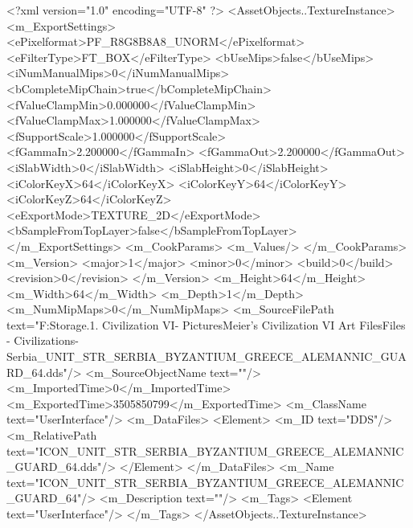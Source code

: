 <?xml version="1.0" encoding="UTF-8" ?>
<AssetObjects..TextureInstance>
	<m_ExportSettings>
		<ePixelformat>PF_R8G8B8A8_UNORM</ePixelformat>
		<eFilterType>FT_BOX</eFilterType>
		<bUseMips>false</bUseMips>
		<iNumManualMips>0</iNumManualMips>
		<bCompleteMipChain>true</bCompleteMipChain>
		<fValueClampMin>0.000000</fValueClampMin>
		<fValueClampMax>1.000000</fValueClampMax>
		<fSupportScale>1.000000</fSupportScale>
		<fGammaIn>2.200000</fGammaIn>
		<fGammaOut>2.200000</fGammaOut>
		<iSlabWidth>0</iSlabWidth>
		<iSlabHeight>0</iSlabHeight>
		<iColorKeyX>64</iColorKeyX>
		<iColorKeyY>64</iColorKeyY>
		<iColorKeyZ>64</iColorKeyZ>
		<eExportMode>TEXTURE_2D</eExportMode>
		<bSampleFromTopLayer>false</bSampleFromTopLayer>
	</m_ExportSettings>
	<m_CookParams>
		<m_Values/>
	</m_CookParams>
	<m_Version>
		<major>1</major>
		<minor>0</minor>
		<build>0</build>
		<revision>0</revision>
	</m_Version>
	<m_Height>64</m_Height>
	<m_Width>64</m_Width>
	<m_Depth>1</m_Depth>
	<m_NumMipMaps>0</m_NumMipMaps>
	<m_SourceFilePath text="F:\Mod Storage\2.1. Civilization VI\Mods\Archive - Pictures\Sid Meier's Civilization VI Art Files\Art Files - Civilizations\Civilization - Serbia\ICON_UNIT_STR_SERBIA_BYZANTIUM_GREECE_ALEMANNIC_GUARD_64.dds"/>
	<m_SourceObjectName text=""/>
	<m_ImportedTime>0</m_ImportedTime>
	<m_ExportedTime>3505850799</m_ExportedTime>
	<m_ClassName text="UserInterface"/>
	<m_DataFiles>
		<Element>
			<m_ID text="DDS"/>
			<m_RelativePath text="ICON_UNIT_STR_SERBIA_BYZANTIUM_GREECE_ALEMANNIC_GUARD_64.dds"/>
		</Element>
	</m_DataFiles>
	<m_Name text="ICON_UNIT_STR_SERBIA_BYZANTIUM_GREECE_ALEMANNIC_GUARD_64"/>
	<m_Description text=""/>
	<m_Tags>
		<Element text="UserInterface"/>
	</m_Tags>
</AssetObjects..TextureInstance>

